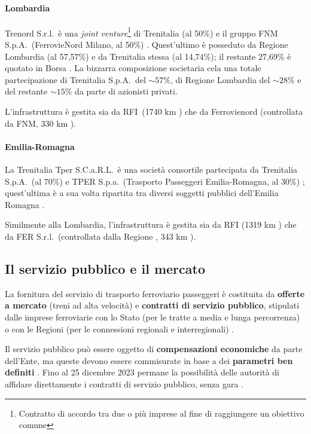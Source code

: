 \documentclass[12pt,italian]{report}
\begin{document}
	\paragraph{Lombardia}
	
	Trenord S.r.l.\ è una \textit{joint venture}\footnote{Contratto di accordo tra due o più imprese al fine di raggiungere un obiettivo comune} di Trenitalia (al 50\%) e il gruppo FNM S.p.A.\ (FerrovieNord Milano, al 50\%) \cite{TrenordChiSiamo}. 
	Quest'ultimo è posseduto da Regione Lombardia (al 57,57\%) e da Trenitalia stessa (al 14,74\%); il restante 27,69\% è quotato in Borsa \cite{BorsaItalianaFNM}.
	La bizzarra composizione societaria cela una totale partecipazione di Trenitalia S.p.A.\ del $\sim 57\%$, di Regione Lombardia del $\sim 28$\% e del restante $\sim 15\%$ da parte di azionisti privati.
	
	L'infrastruttura è gestita sia da RFI\ (1740 km \cite{RfiKm}) che da Ferrovienord (controllata da FNM, 330 km \cite{FerNordKm}).
	
	\paragraph{Emilia-Romagna}
	
	La Trenitalia Tper S.C.a.R.L.\ è una società consortile partecipata da Trenitalia S.p.A.\ (al 70\%) e TPER S.p.a.\ (Trasporto Passeggeri Emilia-Romagna, al 30\%) \cite{NascitaTper}; quest'ultima è a sua volta ripartita tra diversi soggetti pubblici dell'Emilia Romagna \cite{SociTper}.
	
	Similmente alla Lombardia, l'infrastruttura è gestita sia da RFI (1319 km \cite{RfiKm}) che da FER S.r.l.\ (controllata dalla Regione \cite{FerChiSiamo}, 343 km \cite{FerKm}).
	
	\subsection{Il servizio pubblico e il mercato}
	
	La fornitura del servizio di trasporto ferroviario passeggeri è costituita da \textbf{offerte a mercato} (treni ad alta velocità) e \textbf{contratti di servizio pubblico}, stipulati dalle imprese ferroviarie con lo Stato (per le tratte a media e lunga percorrenza) o con le Regioni (per le connessioni regionali e interregionali) \cite[vedi][paragrafo \textit{``Gli obblighi di servizio pubblico e i contratti di servizio''}]{CameraTrasportoFerroviario}.
	
	Il servizio pubblico può essere oggetto di \textbf{compensazioni economiche} da parte dell'Ente, ma queste devono essere commisurate in base a dei \textbf{parametri ben definiti} \cite[art.\ 4 comma 1]{Reg1370}.
	Fino al 25 dicembre 2023 permane la possibilità delle autorità di affidare direttamente i contratti di servizio pubblico, senza gara \cite[art.\ 8, comma 2, lettera iii)]{Reg1370}.
	
\end{document}
